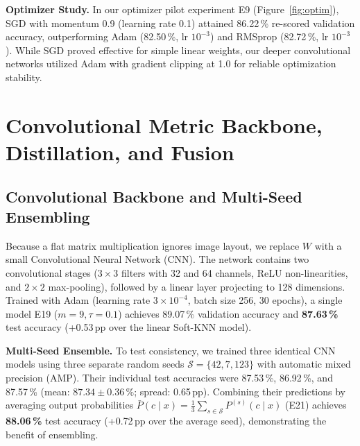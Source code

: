 \documentclass[10pt,a4paper]{article}
\begin{document}
\textbf{Optimizer Study.} In our optimizer pilot experiment E9 (Figure~\ref{fig:optim}), SGD with momentum 0.9 (learning rate 0.1) attained 86.22\,\% re-scored validation accuracy, outperforming Adam (82.50\,\%, lr $10^{-3}$) and RMSprop (82.72\,\%, lr $10^{-3}$). While SGD proved effective for simple linear weights, our deeper convolutional networks utilized Adam with gradient clipping at 1.0 for reliable optimization stability.

\section{Convolutional Metric Backbone, Distillation, and Fusion}\label{sec:conv}
\subsection{Convolutional Backbone and Multi-Seed Ensembling}\label{sec:convmodel}
Because a flat matrix multiplication ignores image layout, we replace $W$ with a small Convolutional Neural Network (CNN). The network contains two convolutional stages ($3\times3$ filters with 32 and 64 channels, ReLU non-linearities, and $2\times2$ max-pooling), followed by a linear layer projecting to 128 dimensions. Trained with Adam (learning rate $3\times10^{-4}$, batch size 256, 30 epochs), a single model E19 ($m=9, \tau=0.1$) achieves 89.07\,\% validation accuracy and \textbf{87.63\,\%} test accuracy (+0.53\,pp over the linear Soft-KNN model).

\textbf{Multi-Seed Ensemble.} To test consistency, we trained three identical CNN models using three separate random seeds $\mathcal{S}=\{42, 7, 123\}$ with automatic mixed precision (AMP). Their individual test accuracies were 87.53\,\%, 86.92\,\%, and 87.57\,\% (mean: $87.34\pm0.36\,\%$; spread: 0.65\,pp). Combining their predictions by averaging output probabilities $\bar{P}(c\mid x) = \frac{1}{3}\sum_{s\in\mathcal{S}} P^{(s)}(c\mid x)$ (E21) achieves \textbf{88.06\,\%} test accuracy (+0.72\,pp over the average seed), demonstrating the benefit of ensembling.
\end{document}
